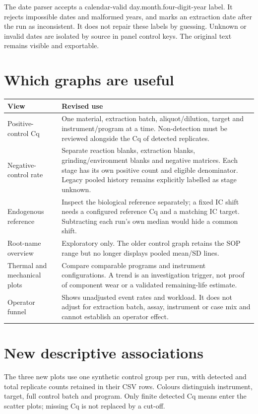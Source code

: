 The date parser accepts a calendar-valid day.month.four-digit-year label. It rejects impossible dates and malformed years,
and marks an extraction date after the run as inconsistent. It does not repair these labels by guessing. Unknown or invalid
dates are isolated by source in panel control keys. The original text remains visible and exportable.




\section{Which graphs are useful}
\begin{xltabular}{\linewidth}{|X|X|}
\toprule View & Revised use\\\midrule\endhead
Positive-control Cq & One material, extraction batch, aliquot/dilution, target and instrument/program at a time. Non-detection
must be reviewed alongside the Cq of detected replicates.\\
Negative-control rate & Separate reaction blanks, extraction blanks, grinding/environment blanks and negative matrices.
Each stage has its own positive count and eligible denominator. Legacy pooled history remains explicitly labelled as stage unknown.\\
Endogenous reference & Inspect the biological reference separately; a fixed IC shift needs a configured reference Cq and a
matching IC target. Subtracting each run's own median would hide a common shift.\\
Root-name overview & Exploratory only. The older control graph retains the SOP range but no longer displays pooled mean/SD lines.\\
Thermal and mechanical plots & Compare comparable programs and instrument configurations. A trend is an investigation trigger,
not proof of component wear or a validated remaining-life estimate.\\
Operator funnel & Shows unadjusted event rates and workload. It does not adjust for extraction batch, assay, instrument or
case mix and cannot establish an operator effect.\\
\bottomrule
\end{xltabular}

\section{New descriptive associations}
The three new plots use one synthetic control group per run, with detected and total replicate counts retained in their
CSV rows. Colours distinguish instrument, target, full control batch and program. Only finite detected Cq means enter the
scatter plots; missing Cq is not replaced by a cut-off.


